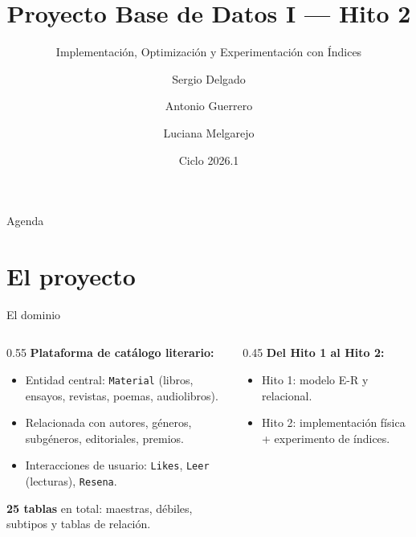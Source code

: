 \documentclass[10pt,aspectratio=169]{beamer}
\title[Hito 2 - BD Literaria]{Proyecto Base de Datos I --- Hito 2}
\subtitle{Implementación, Optimización y Experimentación con Índices}
\author[Delgado, Guerrero, Melgarejo]{Sergio Delgado \and Antonio Guerrero \and Luciana Melgarejo}
\institute[UTEC]{Plataforma de catálogo literario}
\date{Ciclo 2026.1}
\begin{document}
\begin{frame}\titlepage\end{frame}

\begin{frame}{Agenda}
\tableofcontents
\end{frame}

\section{El proyecto}
\begin{frame}{El dominio}
\begin{columns}
\begin{column}{0.55\textwidth}
\textbf{Plataforma de catálogo literario:}
\begin{itemize}
  \item Entidad central: \texttt{Material} (libros, ensayos, revistas, poemas, audiolibros).
  \item Relacionada con autores, géneros, subgéneros, editoriales, premios.
  \item Interacciones de usuario: \texttt{Likes}, \texttt{Leer} (lecturas), \texttt{Resena}.
\end{itemize}
\vspace{0.3cm}
\textbf{25 tablas} en total: maestras, débiles, subtipos y tablas de relación.
\end{column}
\begin{column}{0.45\textwidth}
\footnotesize
\textbf{Del Hito 1 al Hito 2:}
\begin{itemize}
  \item Hito 1: modelo E-R y relacional.
  \item Hito 2: implementación física + experimento de índices.
\end{itemize}
\end{column}
\end{columns}
\end{frame}
\end{document}
